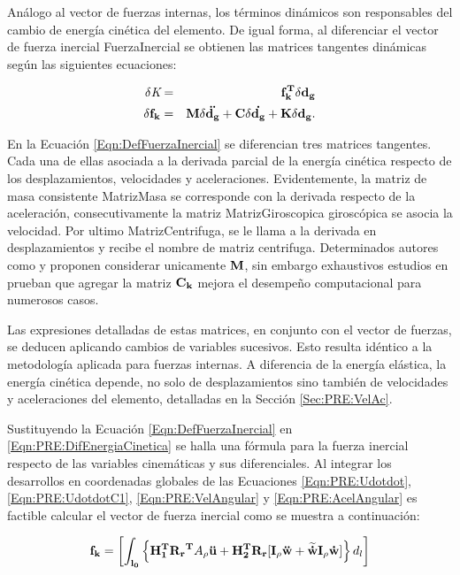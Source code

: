 Análogo al vector de fuerzas internas, los términos dinámicos son responsables del cambio de energía cinética del elemento. De igual forma, al diferenciar el vector de fuerza inercial \gls{FuerzaInercial} se obtienen las matrices tangentes dinámicas según las siguientes ecuaciones:

\begin{eqnarray}
		\label{Eqn:PRE:defFuerzaInercial}
	\delta\textit{K}&=&\bf{f_k^T}\delta\bf{d}_g\\
	\label{Eqn:DefFuerzaInercial}
	\delta\bf{f_k}&=& \bf{M}\delta \ddot{\bf{d_g}}+\bf{C}\delta
	\dot{\bf{d_g}}+\bf{K}\delta{\bf{d_g}}.
\end{eqnarray}


En la Ecuación \ref{Eqn:DefFuerzaInercial} se diferencian tres matrices tangentes. Cada una de ellas asociada a la derivada parcial de la energía cinética respecto de los desplazamientos, velocidades y aceleraciones. Evidentemente, la matriz de masa consistente \gls{MatrizMasa} se corresponde con la derivada respecto de la aceleración, consecutivamente la matriz \gls{MatrizGiroscopica} giroscópica se asocia la velocidad. Por ultimo \gls{MatrizCentrifuga}, se le llama a la derivada en desplazamientos y recibe el nombre de matriz centrifuga. Determinados autores como \cite{cardona1988beam} y \cite{hsiao1999consistent} proponen considerar unicamente $\bf{M}$, sin embargo exhaustivos estudios en \citep{hsiao1999consistent} prueban que agregar la matriz $\bf{C_k}$ mejora el desempeño computacional para numerosos casos.

Las expresiones detalladas de estas matrices, en conjunto con el vector de fuerzas, se deducen aplicando cambios de variables sucesivos. Esto resulta idéntico a la metodología aplicada para fuerzas internas. A diferencia de la energía elástica, la energía cinética depende, no solo de desplazamientos sino también de velocidades y aceleraciones del elemento, detalladas en la Sección \ref{Sec:PRE:VelAc}.

Sustituyendo la Ecuación \eqref{Eqn:DefFuerzaInercial} en \eqref{Eqn:PRE:DifEnergiaCinetica} se halla una fórmula para la fuerza inercial respecto de las variables cinemáticas y sus diferenciales. Al integrar los desarrollos en coordenadas globales de las Ecuaciones \eqref{Eqn:PRE:Udotdot}, \eqref{Eqn:PRE:UdotdotC1}, \eqref{Eqn:PRE:VelAngular} y \eqref{Eqn:PRE:AcelAngular}  es factible calcular el vector de fuerza inercial como se muestra a continuación:

\begin{equation}\label{Eqn:PRE:FuerzaInercial}
\bf{f}_k=\left [ \int _{l_0} \left \{ \bf{H}_1^T\bf{R_r}^T \text{$A_\rho$}\ddot{\bf{u}} +\bf{H}_2^T \bf{R_r} [\bf{I}_\rho\ddot{\bf{w}}+\widetilde{\dot{\bf{w}}}\bf{I}_\rho\dot{w}] \right \} \text{$d_l$} \right  ]
\end{equation}

